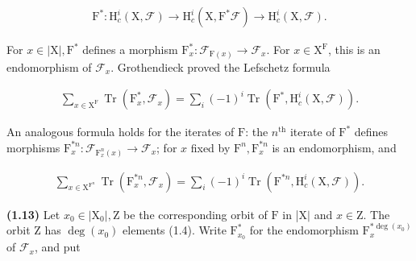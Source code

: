 \documentclass[10pt,leqno]{article}
\begin{document}
\begin{equation*}\begin{gathered}\mathrm{F}^{*} : \mathrm{H}_{c}^{i}(\mathrm{X},\mathcal{F} ) \longrightarrow  \mathrm{H}_{c}^{i}(\mathrm{X},\mathrm{F}^{*}\mathcal{F} ) \longrightarrow  \mathrm{H}_{c}^{i}(\mathrm{X},\mathcal{F} ).\end{gathered}\end{equation*}

\noindent For \(x\in |\mathrm{X}|, \mathrm{F}^{*}\) defines a morphism \(\mathrm{F}_{x}^{*} : \mathcal{F} _{\mathrm{F}(x)}\longrightarrow \mathcal{F} _{x}\). For \(x\in \mathrm{X}^{\mathrm{F}}\), this is an endomorphism of \(\mathcal{F} _{x}\). Grothendieck proved the Lefschetz formula\par

\begin{equation*}\begin{gathered}\sum _{x\in \mathrm{X}^{\mathrm{F}}} \operatorname{Tr}(\mathrm{F}_{x}^{*},\mathcal{F} _{x}) = \sum _{i} (- 1)^{i} \operatorname{Tr}(\mathrm{F}^{*},\mathrm{H}_{c}^{i}(\mathrm{X},\mathcal{F} )).\end{gathered}\end{equation*}

\noindent An analogous formula holds for the iterates of \(\mathrm{F}\): the \(n^{\mathrm{th}}\) iterate of \(\mathrm{F}^{*}\) defines morphisms \(\mathrm{F}_{x}^{*n} : \mathcal{F} _{\mathrm{F}_{x}^{n}(x)}\longrightarrow \mathcal{F} _{x}\); for \(x\) fixed by \(\mathrm{F}^{n}, \mathrm{F}_{x}^{*n}\) is an endomorphism, and\par

\begin{equation*}\begin{gathered}\sum _{x\in \mathrm{X}^{\mathrm{F}^{n}}} \operatorname{Tr}(\mathrm{F}_{x}^{*n},\mathcal{F} _{x}) = \sum _{i} (- 1)^{i} \operatorname{Tr}(\mathrm{F}^{*n},\mathrm{H}_{c}^{i}(\mathrm{X},\mathcal{F} )).\end{gathered}\tag{1.12.1}\end{equation*}

\noindent \textbf{(1.13)} Let \(x_{0}\in |\mathrm{X}_{0}|, \mathrm{Z}\) be the corresponding orbit of \(\mathrm{F}\) in |\(\mathrm{X}|\) and \(x\in \mathrm{Z}\). The orbit \(\mathrm{Z}\) has \(\operatorname{deg}(x_{0})\) elements (1.4). Write \(\mathrm{F}_{x_{0}}^{*}\) for the endomorphism \(\mathrm{F}_{x}^{*\operatorname{deg}(x_{0})}\) of \(\mathcal{F} _{x}\), and put\par
\end{document}

